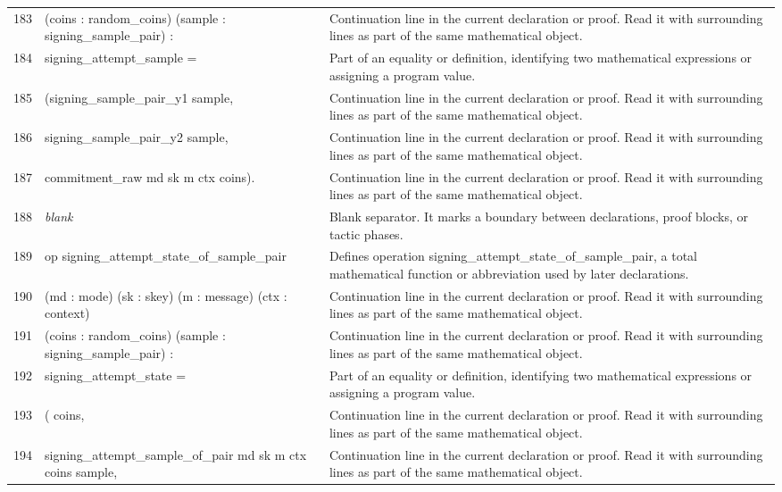 \documentclass[10pt]{article}
\begin{document}
\begin{longtable}{r L{0.53\textwidth} L{0.37\textwidth}}
183 & {\ttfamily\scriptsize    (coins : random\_coins) (sample : signing\_sample\_pair) :} & Continuation line in the current declaration or proof.  Read it with surrounding lines as part of the same mathematical object. \\
184 & {\ttfamily\scriptsize    signing\_attempt\_sample =} & Part of an equality or definition, identifying two mathematical expressions or assigning a program value. \\
185 & {\ttfamily\scriptsize   (signing\_sample\_pair\_y1 sample,} & Continuation line in the current declaration or proof.  Read it with surrounding lines as part of the same mathematical object. \\
186 & {\ttfamily\scriptsize    signing\_sample\_pair\_y2 sample,} & Continuation line in the current declaration or proof.  Read it with surrounding lines as part of the same mathematical object. \\
187 & {\ttfamily\scriptsize    commitment\_raw md sk m ctx coins).} & Continuation line in the current declaration or proof.  Read it with surrounding lines as part of the same mathematical object. \\
188 & {\ttfamily\scriptsize \emph{blank}} & Blank separator.  It marks a boundary between declarations, proof blocks, or tactic phases. \\
189 & {\ttfamily\scriptsize op signing\_attempt\_state\_of\_sample\_pair} & Defines operation signing\_attempt\_state\_of\_sample\_pair, a total mathematical function or abbreviation used by later declarations. \\
190 & {\ttfamily\scriptsize    (md : mode) (sk : skey) (m : message) (ctx : context)} & Continuation line in the current declaration or proof.  Read it with surrounding lines as part of the same mathematical object. \\
191 & {\ttfamily\scriptsize    (coins : random\_coins) (sample : signing\_sample\_pair) :} & Continuation line in the current declaration or proof.  Read it with surrounding lines as part of the same mathematical object. \\
192 & {\ttfamily\scriptsize    signing\_attempt\_state =} & Part of an equality or definition, identifying two mathematical expressions or assigning a program value. \\
193 & {\ttfamily\scriptsize   ( coins,} & Continuation line in the current declaration or proof.  Read it with surrounding lines as part of the same mathematical object. \\
194 & {\ttfamily\scriptsize     signing\_attempt\_sample\_of\_pair md sk m ctx coins sample,} & Continuation line in the current declaration or proof.  Read it with surrounding lines as part of the same mathematical object. \\

\end{longtable}
\end{document}

